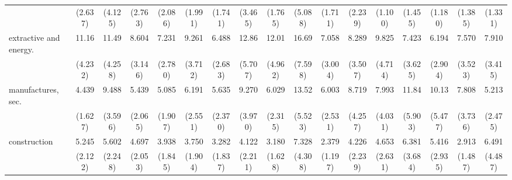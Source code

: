 {\begin{tabular}{l*{16}{c}}
                    &     (2.637)         &     (4.125)         &     (2.763)         &     (2.086)         &     (1.991)         &     (1.741)         &     (3.465)         &     (1.765)         &     (5.088)         &     (1.711)         &     (2.239)         &     (1.100)         &     (1.455)         &     (1.180)         &     (1.385)         &     (1.331)         \\
[1em]
extractive and energy.&       11.16\sym{***}&       11.49\sym{***}&       8.604\sym{***}&       7.231\sym{***}&       9.261\sym{***}&       6.488\sym{***}&       12.86\sym{***}&       12.01\sym{***}&       16.69\sym{***}&       7.058\sym{***}&       8.289\sym{***}&       9.825\sym{***}&       7.423\sym{***}&       6.194\sym{***}&       7.570\sym{***}&       7.910\sym{***}\\
                    &     (4.232)         &     (4.258)         &     (3.146)         &     (2.780)         &     (3.712)         &     (2.683)         &     (5.707)         &     (4.962)         &     (7.598)         &     (3.004)         &     (3.507)         &     (4.714)         &     (3.625)         &     (2.904)         &     (3.523)         &     (3.415)         \\
[1em]
manufactures, sec.  &       4.439\sym{***}&       9.488\sym{***}&       5.439\sym{***}&       5.085\sym{***}&       6.191\sym{***}&       5.635\sym{***}&       9.270\sym{***}&       6.029\sym{***}&       13.52\sym{***}&       6.003\sym{***}&       8.719\sym{***}&       7.993\sym{***}&       11.84\sym{***}&       10.13\sym{***}&       7.808\sym{***}&       5.213\sym{***}\\
                    &     (1.627)         &     (3.596)         &     (2.065)         &     (1.907)         &     (2.551)         &     (2.370)         &     (3.970)         &     (2.315)         &     (5.523)         &     (2.531)         &     (4.257)         &     (4.031)         &     (5.903)         &     (5.477)         &     (3.736)         &     (2.475)         \\
[1em]
construction        &       5.245\sym{***}&       5.602\sym{***}&       4.697\sym{***}&       3.938\sym{**} &       3.750\sym{**} &       3.282\sym{*}  &       4.122\sym{**} &       3.180\sym{*}  &       7.328\sym{***}&       2.379         &       4.226\sym{**} &       4.653\sym{**} &       6.381\sym{**} &       5.416\sym{**} &       2.913\sym{*}  &       6.491\sym{**} \\
                    &     (2.122)         &     (2.248)         &     (2.053)         &     (1.845)         &     (1.904)         &     (1.837)         &     (2.211)         &     (1.628)         &     (4.308)         &     (1.197)         &     (2.239)         &     (2.631)         &     (3.684)         &     (2.935)         &     (1.487)         &     (4.487)         \\

\end{tabular}}
